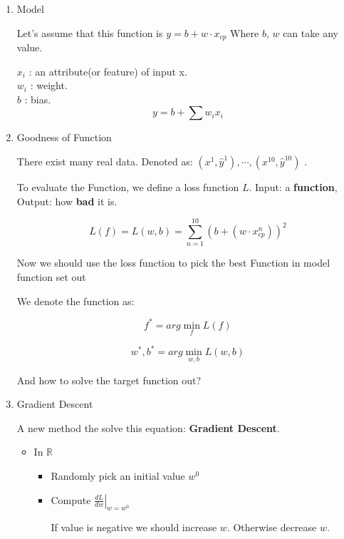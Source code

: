 \documentclass{article}
\newenvironment{propblock}[1][\textbf{Proposition}]{\begin{tcolorbox}
[title = \textbf{#1}, colback=Salmon!20, colframe=Salmon!90!Black]}{\end{tcolorbox}}
\newenvironment{colblock}[1][\textbf{Collary}]{\begin{tcolorbox}[colback=JungleGreen!10!Cerulean!15,colframe=CornflowerBlue!60!Black,title = \textbf{#1}]}{\end{tcolorbox}}
\begin{document}
\begin{enumerate}
    \item Model

    Let's assume that this function is $y = b + w \cdot x_{cp}$ Where $b$, $w$ can take any value.

    \begin{colblock}[Definition of Linear Model]
    $x_i$ : an attribute(or feature) of input x.\\
    $w_i$ : weight.\\
    $b$ : bias.
    $$
    y = b + \sum w_i x_i
    $$
    \end{colblock}

    \item Goodness of Function

    There exist many real data. Denoted as: $(x^1,\hat{y}^1),\cdots,(x^{10},\hat{y}^{10})$ .

    To evaluate the Function, we define a loss function $L$. Input: a \textbf{function}, Output: how \textbf{bad} it is.

    $$
    L(f) = L(w,b)= \sum_{n=1}^{10}\left( b+\left(w \cdot x_{c p}^{n}\right)\right)^{2}
    $$

    Now we should use the loss function to pick the best Function in model function set out

    We denote the function as:

    $$
    f^*=arg \min_f L(f)
    $$

     $$
    w^*,b^*=arg \min_{w,b} L(w,b)
    $$

    And how to solve the target function out?

    \item Gradient Descent

    A new method the solve this equation: \textbf{Gradient Descent}.

    \begin{propblock}[How To Use Gradient Descent]
        \begin{itemize}
            \item In $\mathbb{R}$
            
            \begin{itemize}
                \item Randomly pick an initial value $w^0$
                
                \item Compute $\left.\frac{d L}{d w}\right|_{w=w^{0}}$

                If value is negative we should increase $w$. Otherwise decrease $w$.
    

\end{itemize}
\end{itemize}
\end{propblock}
\end{enumerate}
\end{document}
